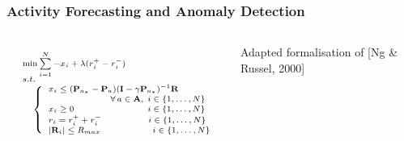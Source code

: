 \begin{frame}
	\frametitle{Activity Forecasting and Anomaly Detection}
	
	\begin{columns}[T]
		
		\vspace{-0.2cm}
		
		\begin{equation*}
			\hspace{0.3cm}
			\scriptsize
			\begin{array}{ll}
				\min \sum\limits_{i=1}^N -x_i + \lambda (r_i^+ - r_i^-)
				\vspace{-0.35cm} \\ \\
				s.t. \\ \;\;\;\;
				\left \{
					\begin{array}{ll}
						x_i \leq (\mathbf{P}_{a_*} - \mathbf{P}_a)(\mathbf{I} - \gamma
						\mathbf{P}_{a_*})^{-1} \mathbf{R} \\
						\vspace{-0.25cm} \\
						\;\;\;\;\;\;\;\;\;\;\;\;\;\;\;\;\;\;\;\;\;
						\;\;\; \forall \, a \in \mathbf{A}, \; i \in \{ 1, \ldots, N \}
						\vspace{-0.25cm}\\ \\
						x_i \geq 0 \;\;\;\;\;\;\,\,\,\,\;\;\;\,\,\,\,\,\;\,\,\,\,\,\,\,\;\;\;\;\;
						\;\,\,\,\,\, i \in \{ 1, \ldots, N \}
						\vspace{-0.25cm} \\ \\
						r_i = r_i^+ + r_i^- \;\,\,\,\,\,\;\,\,\,\,\,\,\,\;\;\;\;\;
						\;\,\,\,\,\, i \in \{ 1, \ldots, N \}
						\vspace{-0.25cm}
						\\ \\
						| \mathbf{R}_i | \leq R_{max} \;\;\;\;\;\;\;\;\;\;\;\,\,\,\,\;\;\
						\,\,\,\,\,\, i \in \{ 1, \ldots, N \}
					\end{array}
				\right.
				\vspace{0.2cm}
			\end{array}
		\end{equation*}
		
		\tiny
		
		\vspace{-0.8cm}
		
		\begin{tabbing}
			\hspace{0.2cm}
			Adapted formalisation of [Ng \& Russel, 2000]
		\end{tabbing}
		

\end{columns}
\end{frame}
